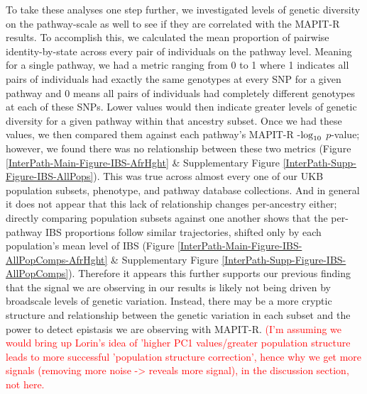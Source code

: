 \documentclass[12pt,a4paper]{article}
\def\log{{\rm log}}
\begin{document}
To take these analyses one step further, we investigated levels of genetic diversity on the pathway-scale as well to see if they are correlated with the MAPIT-R results. To accomplish this, we calculated the mean proportion of pairwise identity-by-state across every pair of individuals on the pathway level. Meaning for a single pathway, we had a metric ranging from 0 to 1 where 1 indicates all pairs of individuals had exactly the same genotypes at every SNP for a given pathway and 0 means all pairs of individuals had completely different genotypes at each of these SNPs. Lower values would then indicate greater levels of genetic diversity for a given pathway within that ancestry subset. Once we had these values, we then compared them against each pathway's MAPIT-R -$\log_{10}$ $p$-value; however, we found there was no relationship between these two metrics (Figure \ref{InterPath-Main-Figure-IBS-AfrHght} \& Supplementary Figure \ref{InterPath-Supp-Figure-IBS-AllPops}). This was true across almost every one of our UKB population subsets, phenotype, and pathway database collections. And in general it does not appear that this lack of relationship changes per-ancestry either; directly comparing population subsets against one another shows that the per-pathway IBS proportions follow similar trajectories, shifted only by each population's mean level of IBS (Figure \ref{InterPath-Main-Figure-IBS-AllPopComps-AfrHght} \& Supplementary Figure \ref{InterPath-Supp-Figure-IBS-AllPopComps}). Therefore it appears this further supports our previous finding that the signal we are observing in our results is likely not being driven by broadscale levels of genetic variation. Instead, there may be a more cryptic structure and relationship between the genetic variation in each subset and the power to detect epistasis we are observing with MAPIT-R. \textcolor{red}{(I'm assuming we would bring up Lorin's idea of 'higher PC1 values/greater population structure leads to more successful 'population structure correction', hence why we get more signals (removing more noise -> reveals more signal), in the discussion section, not here.}
\end{document}
